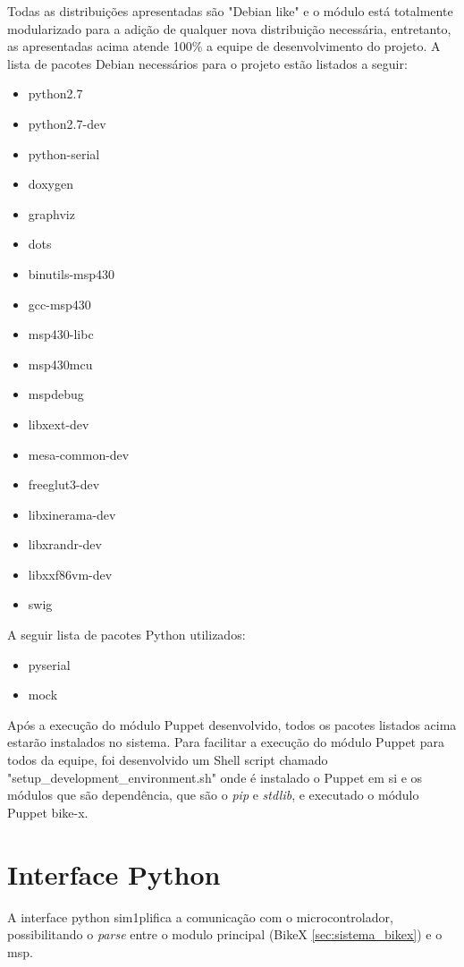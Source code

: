 Todas as distribuições apresentadas são "Debian like" e o módulo está totalmente modularizado para a adição de qualquer nova distribuição necessária, entretanto, as apresentadas acima atende 100\% a equipe de desenvolvimento do projeto. A lista de pacotes Debian necessários para o projeto estão listados a seguir:

\begin{itemize}
\item python2.7
\item python2.7-dev
\item python-serial
\item doxygen
\item graphviz
\item dots
\item binutils-msp430
\item gcc-msp430
\item msp430-libc
\item msp430mcu
\item mspdebug
\item libxext-dev
\item mesa-common-dev
\item freeglut3-dev
\item libxinerama-dev
\item libxrandr-dev
\item libxxf86vm-dev
\item swig
\end{itemize}

A seguir lista de pacotes Python utilizados:

\begin{itemize}
\item pyserial
\item mock
\end{itemize}

Após a execução do módulo Puppet desenvolvido, todos os pacotes listados acima estarão instalados no sistema. Para facilitar a execução do módulo Puppet para todos da equipe, foi desenvolvido um Shell script chamado "setup\_development\_environment.sh" onde é instalado o Puppet em si e os módulos que são dependência, que são o \textit{pip} e \textit{stdlib}, e executado o módulo Puppet bike-x.


\section{Interface Python} %
\label{sec:interface_python}

A interface \gls{python} sim1plifica a comunicação com o microcontrolador, possibilitando o \textit{parse} entre o modulo principal (BikeX \ref{sec:sistema_bikex}) e o \gls{msp}.

